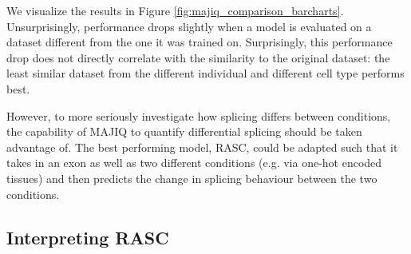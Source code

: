 We visualize the results in Figure \ref{fig:majiq_comparison_barcharts}.
Unsurprisingly, performance drops slightly when a model is evaluated on a dataset different from the one it was trained on. Surprisingly, this performance drop does not directly correlate with the similarity to the original dataset: the least similar dataset from the different individual and different cell type performs best. 

However, to more seriously investigate how splicing differs between conditions, the capability of MAJIQ to quantify differential splicing should be taken advantage of. The best performing model, RASC, could be adapted such that it takes in an exon as well as two different conditions (e.g. via one-hot encoded tissues) and then predicts the change in splicing behaviour between the two conditions. 


%



















\subsection{Interpreting RASC} \label{subsubsec:attn_interpretation}


